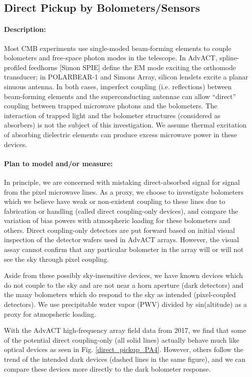 \subsection{Direct Pickup by Bolometers/Sensors}

\paragraph{Description:}
Most CMB experiments use single-moded beam-forming elements to couple bolometers and free-space photon modes in the telescope. In AdvACT, spline-profiled feedhorns [Simon SPIE] \cite{Simon} define the EM mode exciting the orthomode transducer; in POLARBEAR-1 and Simons Array, silicon lenslets excite a planar sinuous antenna. In both cases, imperfect coupling (i.e. reflections) between beam-forming elements and the superconducting antennae can allow ``direct'' coupling between trapped microwave photons and the bolometers. The interaction of trapped light and the bolometer structures (considered as absorbers) is not the subject of this investigation. We assume thermal excitation of absorbing dielectric elements can produce excess microwave power in these devices.

\paragraph{Plan to model and/or measure:}
In principle, we are concerned with mistaking direct-absorbed signal for signal from the pixel microwave lines. As a proxy, we choose to investigate bolometers which we believe have weak or non-existent coupling to these lines due to fabrication or handling (called direct coupling-only devices), and compare the variation of bias powers with atmospheric loading for these bolometers and others. Direct coupling-only detectors are put forward based on initial visual inspection of the detector wafers used in AdvACT arrays. However, the visual assay cannot confirm that any particular bolometer in the array will or will not see the sky through pixel coupling. 

Aside from these possibly sky-insensitive devices, we have known devices which do not couple to the sky and are not near a horn aperture (dark detectors) and the many bolometers which do respond to the sky as intended (pixel-coupled detectors). We use precipitable water vapor (PWV) divided by sin(altitude) as a proxy for atmopsheric loading.

With the AdvACT high-frequency array field data from 2017, we find that some of the potential direct coupling-only (all solid lines) actually behave much like optical devices as seen in Fig. \ref{direct_pickup_PA4}. However, others follow the trend of the intended dark devices (dashed lines in the same figure), and we can compare these devices more directly to the dark bolometer response.

